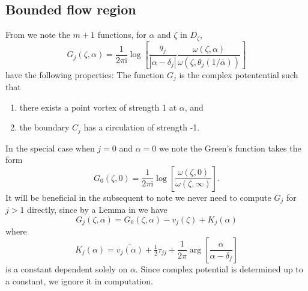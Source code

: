 \documentclass[12pt,fleqn]{article}
\newcommand{\conj}[1]{\overline{#1}}
\newcommand{\uconj}[1]{1/\conj{#1}}
\renewcommand{\i}{\mathrm{i}}
\begin{document}
\subsection{Bounded flow region}
From \cite{greensfunctions} we note the $m+1$ functions, for $\alpha$ and $\zeta$ in $D_\zeta$,
\begin{equation}
  G_j(\zeta,\alpha) = \frac{1}{2\pi\i} \log \left[ \frac{q_j}{|\alpha - \delta_j|} \frac{\omega(\zeta,\alpha)}{\omega(\zeta,\theta_j(\uconj{\alpha}))} \right]
  \label{eq:greensfunction}
\end{equation}
have the following properties: The function $G_j$ is the complex potentential such that
\begin{enumerate}
  \item there exists a point vortex of strength 1 at $\alpha$, and
  \item the boundary $C_j$ has a circulation of strength -1.
\end{enumerate}
In the special case when $j=0$ and $\alpha=0$ we note the Green's function takes the form
\begin{equation*}
  G_0(\zeta,0) = \frac{1}{2\pi\i} \log\left[ \frac{\omega(\zeta,0)}{\omega(\zeta,\infty)} \right].
\end{equation*}
It will be beneficial in the subsequent to note we never need to compute $G_j$ for $j>1$ directly, since by a Lemma in \cite{primecalc} we have
\begin{equation}
  G_j(\zeta,\alpha) = G_0(\zeta,\alpha) - v_j(\zeta) + K_j(\alpha)
  \label{eq:greens_identity}
\end{equation}
where
\begin{equation*}
  K_j(\alpha) = \conj{v_j(\alpha)} + \tfrac{1}{2}\tau_{jj} + \frac{1}{2\pi}\arg\left[ \frac{\alpha}{\alpha - \delta_j} \right]
\end{equation*}
is a constant dependent solely on $\alpha$. Since complex potential is determined up to a constant, we ignore it in computation.
\end{document}
